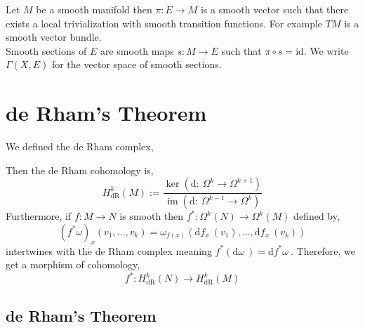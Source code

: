 \documentclass[12pt]{extarticle}
\DeclareMathOperator{\im}{\mathrm{im}}
\newcommand{\id}{\mathrm{id}}
\renewcommand{\d}[1]{ \mathrm{d}#1 \:}
\theoremstyle{definition}
\begin{document}
Let $M$ be a smooth manifold then $\pi : E \to M$ is a smooth vector such that there exists a local trivialization with smooth transition functions. For example $T M$ is a smooth vector bundle.
\bigskip\\
Smooth sections of $E$ are smooth maps $s : M \to E$ such that $\pi \circ s = \id$. We write $\Gamma(X, E)$ for the vector space of smooth sections. 

\section{de Rham's Theorem}

\newcommand{\dR}{\mathrm{dR}}

We defined the de Rham complex,
\begin{center}
\end{center}
Then the de Rham cohomology is,
\[ H^k_{\dR}(M) := \frac{\ker{(\d : \Omega^k \to \Omega^{k+1})}}{\im{(\d : \Omega^{k-1} \to \Omega^k)}} \]
Furthermore, if $f : M \to N$ is smooth then $f^* : \Omega^k(N) \to \Omega^k(M)$ defined by,
\[ (f^* \omega)_x(v_1, \dots, v_k) = \omega_{f(x)}(\d{f_x}(v_1), \dots, \d{f_x}(v_k)) \]
intertwines with the de Rham complex meaning $f^* (\d{\omega}) = \d{f^* \omega}$. Therefore, we get a morphism of cohomology,
\[ f^* : H^k_{\dR}(N) \to H^k_{\dR}(M) \]

\subsection{de Rham's Theorem}
\end{document}
